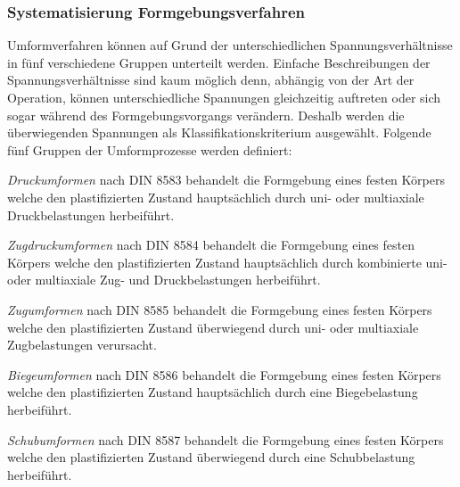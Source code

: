 \documentclass[12pt,a4paper,parskip]{scrartcl}
\begin{document}
{\subsubsection{Systematisierung Formgebungsverfahren}
Umformverfahren können
auf Grund der unterschiedlichen Spannungsverhältnisse in fünf verschiedene Gruppen unterteilt werden. Einfache Beschreibungen der Spannungsverhältnisse sind kaum möglich denn,  abhängig von der Art der Operation, können  unterschiedliche Spannungen gleichzeitig auftreten oder sich sogar  während des Formgebungsvorgangs verändern. Deshalb werden die überwiegenden Spannungen als Klassifikationskriterium ausgewählt. Folgende fünf Gruppen der Umformprozesse werden definiert:
\begin{enumerate*}
\item \emph{Druckumformen} nach DIN 8583 behandelt die Formgebung eines festen Körpers  welche den  plastifizierten  Zustand hauptsächlich durch uni- oder multiaxiale Druckbelastungen herbeiführt.
\item \emph{Zugdruckumformen} nach DIN 8584 behandelt die Formgebung eines festen Körpers  welche den plastifizierten Zustand  hauptsächlich durch kombinierte uni- oder multiaxiale Zug- und Druckbelastungen herbeiführt.
\item \emph{Zugumformen} nach DIN 8585 behandelt die Formgebung eines festen Körpers welche den plastifizierten Zustand überwiegend durch uni- oder multiaxiale Zugbelastungen verursacht.
\item \emph{Biegeumformen} nach DIN 8586 behandelt die Formgebung eines festen Körpers welche den plastifizierten Zustand hauptsächlich durch eine Biegebelastung herbeiführt.
\item \emph{Schubumformen} nach DIN 8587 behandelt die Formgebung eines festen Körpers welche den plastifizierten Zustand überwiegend durch eine Schubbelastung herbeiführt.

\end{enumerate*}

}
\end{document}
